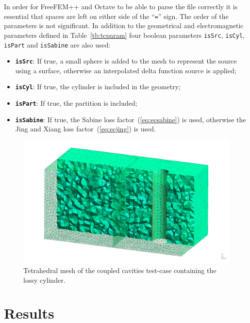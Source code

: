 \documentclass[a4paper]{article}
\numberwithin{equation}{section}
\newcounter{Table}
\begin{document}
\noindent In order for FreeFEM++ and Octave to be able to parse the file correctly it is essential 
that spaces are left on either side of the ``\texttt{=}'' sign. The order of the parameters is 
not significant. In addition to the geometrical and electromagnetic parameters defined in Table~\ref{tb:tcparam} 
four boolean parameters \texttt{isSrc}, \texttt{isCyl}, \texttt{isPart} and \texttt{isSabine} are 
also used:
\begin{itemize}
 \item \textbf{\texttt{isSrc}}: If true, a small sphere is added to the mesh to represent the source using a surface,
 otherwise an interpolated delta function source is applied;
 \item \textbf{\texttt{isCyl}}: If true, the cylinder is included in the geometry;
 \item \textbf{\texttt{isPart}}: If true, the partition is included;
 \item \textbf{\texttt{isSabine}}: If true, the Sabine loss factor~(\ref{eq:ecsabine}) is used,
 otherwise the Jing and Xiang loss factor~(\ref{eq:ecjing}) is used.
\end{itemize}

\begin{figure}[ht]
\begin{center}
\includegraphics[width=0.8\linewidth]{figures/gmshdualmesh}
\vspace{-4mm}
\caption{\label{fg:tcdualmesh} Tetrahedral mesh of the coupled cavities test-case containing the lossy cylinder.}
\end{center}
\end{figure}


\section[Results]{Results}
\label{sc:res}
\end{document}
